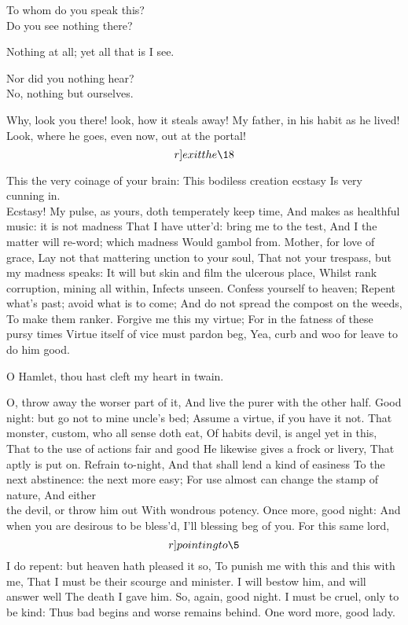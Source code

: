 \documentclass[11pt]{book}
\begin{document}
\3	To whom do you speak this? \\

\1	Do you see nothing there?

\3	Nothing at all; yet all that is I see.

\1	Nor did you nothing hear? \\

\3	No, nothing but ourselves.

\1	Why, look you there! look, how it steals away!
	My father, in his habit as he lived!
	Look, where he goes, even now, out at the portal! 	\[r]exit the \18\]

\3	This the very coinage of your brain:
	This bodiless creation ecstasy
	Is very cunning in. \\

\1	Ecstasy!
	My pulse, as yours, doth temperately keep time,
	And makes as healthful music: it is not madness
	That I have utter'd: bring me to the test,
	And I the matter will re-word; which madness
	Would gambol from. Mother, for love of grace,
	Lay not that mattering unction to your soul,
	That not your trespass, but my madness speaks:
	It will but skin and film the ulcerous place,
	Whilst rank corruption, mining all within,
	Infects unseen. Confess yourself to heaven;
	Repent what's past; avoid what is to come;
	And do not spread the compost on the weeds,
	To make them ranker. Forgive me this my virtue;
	For in the fatness of these pursy times
	Virtue itself of vice must pardon beg,
	Yea, curb and woo for leave to do him good.

\3	O Hamlet, thou hast cleft my heart in twain.

\1	O, throw away the worser part of it,
	And live the purer with the other half.
	Good night: but go not to mine uncle's bed;
	Assume a virtue, if you have it not.
	That monster, custom, who all sense doth eat,
	Of habits devil, is angel yet in this,
	That to the use of actions fair and good
	He likewise gives a frock or livery,
	That aptly is put on. Refrain to-night,
	And that shall lend a kind of easiness
	To the next abstinence: the next more easy;
	For use almost can change the stamp of nature,
	And either \[         \] the devil, or throw him out
	With wondrous potency. Once more, good night:
	And when you are desirous to be bless'd,
	I'll blessing beg of you. For this same lord,
	\[r]pointing to \5\]
	I do repent: but heaven hath pleased it so,
	To punish me with this and this with me,
	That I must be their scourge and minister.
	I will bestow him, and will answer well
	The death I gave him. So, again, good night.
	I must be cruel, only to be kind:
	Thus bad begins and worse remains behind.
	One word more, good lady. \\
\end{document}
